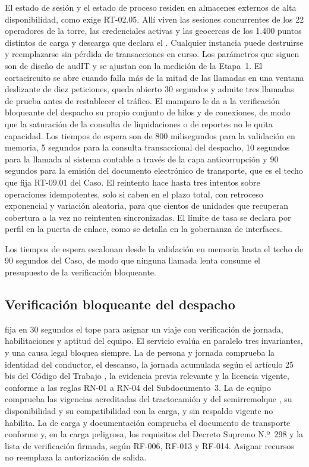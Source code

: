 El estado de sesión y el estado de proceso residen en almacenes externos de alta disponibilidad, como
exige RT-02.05. Allí viven las sesiones concurrentes de los 22 operadores de la torre, las credenciales
activas y las geocercas de los 1.400 puntos distintos de carga y descarga que declara el
. Cualquier instancia puede destruirse y reemplazarse sin pérdida de
transacciones en curso. Los parámetros que siguen son de diseño de audIT y se ajustan con la
medición de la Etapa~1. El cortacircuito se abre cuando falla más de la mitad de las llamadas en una
ventana deslizante de diez peticiones, queda abierto 30 segundos y admite tres llamadas de prueba antes
de restablecer el tráfico. El mamparo le da a la verificación bloqueante del despacho su propio conjunto
de hilos y de conexiones, de modo que la saturación de la consulta de liquidaciones o de reportes no le
quita capacidad. Los tiempos de espera son de 800 milisegundos para la validación en memoria, 5 segundos
para la consulta transaccional del despacho, 10 segundos para la llamada al sistema contable a través
de la capa anticorrupción y 90 segundos para la emisión del documento electrónico de transporte, que es
el techo que fija RT-09.01 del Caso. El reintento hace hasta tres intentos sobre operaciones
idempotentes, solo si caben en el plazo total, con retroceso exponencial y variación aleatoria, para que
cientos de unidades que recuperan cobertura a la vez no reintenten sincronizadas. El límite de tasa se
declara por perfil en la puerta de enlace, como se detalla en la gobernanza de interfaces.

Los tiempos de espera escalonan desde la validación en memoria hasta el techo de 90 segundos del Caso,
de modo que ninguna llamada lenta consume el presupuesto de la verificación bloqueante.

\subsection{Verificación bloqueante del despacho}\label{sec:4-verificacion}

 fija en 30 segundos el tope para asignar un viaje con verificación de jornada,
habilitaciones y aptitud del equipo. El servicio evalúa en paralelo tres invariantes, y una causa legal
bloquea siempre. La de persona y jornada comprueba la identidad del conductor, el descanso, la jornada
acumulada según el artículo 25 bis del Código del Trabajo \parencite{codigo_trabajo_25bis}, la
evidencia previa relevante y la licencia vigente, conforme a las reglas RN-01 a RN-04 del
Subdocumento~3. La de equipo comprueba las vigencias acreditadas del tractocamión y del semirremolque
, su disponibilidad y su compatibilidad con la carga, y sin respaldo vigente no
habilita. La de carga y documentación comprueba el documento de transporte conforme y, en la carga
peligrosa, los requisitos del Decreto Supremo N.º~298 \parencite{ds298} y la lista de verificación
firmada, según RF-006, RF-013 y RF-014. Asignar recursos no reemplaza la autorización de salida.

